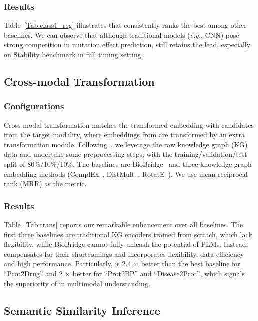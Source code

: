 \subsubsection{Results}
Table~\ref{Tab:class1_reg} illustrates that \ourapproach consistently ranks the best among other baselines. We can observe that although traditional models (\textit{e.g.}, CNN) pose strong competition in mutation effect prediction, \ourapproach still retains the lead, especially on Stability benchmark in full tuning setting.

\subsection{Cross-modal Transformation}
\subsubsection{Configurations}
Cross-modal transformation matches the transformed embedding with candidates from the target modality, where embeddings from \ourapproach are transformed by an extra transformation module. Following~\cite{BioBridge}, we leverage the raw knowledge graph (KG) data and undertake some preprocessing steps, with the training/validation/test split of 80\%/10\%/10\%. The baselines are BioBridge~\cite{BioBridge} and three knowledge graph embedding methods 
(ComplEx~\cite{ComplEx}, DistMult~\cite{DistMult}, RotatE~\cite{RotatE}).
We use mean reciprocal rank (MRR) as the metric.

\subsubsection{Results}
Table~\ref{Tab:trans} reports our remarkable enhancement over all baselines. The first three baselines are traditional KG encoders trained from scratch, which lack flexibility, while BioBridge cannot fully unleash the potential of PLMs. Instead, \ourapproach compensates for their shortcomings and incorporates flexibility, data-efficiency and high performance.
Particularly, \ourapproach is 2.4 $\times$ better than the best baseline for ``Prot2Drug'' and 2 $\times$ better for ``Prot2BP'' and ``Disease2Prot'', which signals the superiority of \ourapproach in multimodal understanding.

\subsection{Semantic Similarity Inference}
\label{Sec:exp4}

